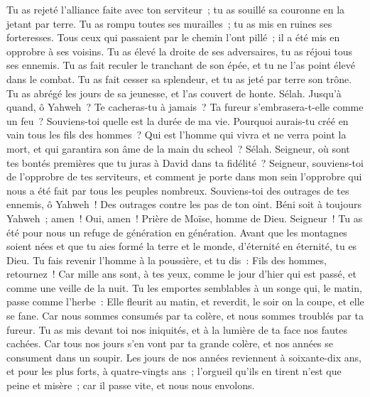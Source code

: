 \begin{multicols}{2}
Tu as rejeté l'alliance faite avec ton serviteur~; tu as souillé sa couronne en la jetant par terre.
Tu as rompu toutes ses murailles~; tu as mis en ruines ses forteresses.
Tous ceux qui passaient par le chemin l'ont pillé~; il a été mis en opprobre à ses voisins.
Tu as élevé la droite de ses adversaires, tu as réjoui tous ses ennemis.
Tu as fait reculer le tranchant de son épée, et tu ne l'as point élevé dans le combat.
Tu as fait cesser sa splendeur, et tu as jeté par terre son trône.
Tu as abrégé les jours de sa jeunesse, et l'as couvert de honte. Sélah.
Jusqu'à quand, ô Yahweh~? Te cacheras-tu à jamais~? Ta fureur s'embrasera-t-elle comme un feu~?
Souviens-toi quelle est la durée de ma vie. Pourquoi aurais-tu créé en vain tous les fils des hommes~?
Qui est l'homme qui vivra et ne verra point la mort, et qui garantira son âme de la main du scheol~? Sélah.
Seigneur, où sont tes bontés premières que tu juras à David dans ta fidélité~?
Seigneur, souviens-toi de l'opprobre de tes serviteurs, et comment je porte dans mon sein l'opprobre qui nous a été fait par tous les peuples nombreux.
Souviens-toi des outrages de tes ennemis, ô Yahweh~! Des outrages contre les pas de ton oint.
Béni soit à toujours Yahweh~; amen~! Oui, amen~!
\VerseOne{}Prière de Moïse, homme de Dieu. Seigneur~! Tu as été pour nous un refuge de génération en génération.
Avant que les montagnes soient nées et que tu aies formé la terre et le monde, d'éternité en éternité, tu es Dieu.
Tu fais revenir l'homme à la poussière, et tu dis~: Fils des hommes, retournez~!
Car mille ans sont, à tes yeux, comme le jour d'hier qui est passé, et comme une veille de la nuit.
Tu les emportes semblables à un songe qui, le matin, passe comme l'herbe~:
Elle fleurit au matin, et reverdit, le soir on la coupe, et elle se fane.
Car nous sommes consumés par ta colère, et nous sommes troublés par ta fureur.
Tu as mis devant toi nos iniquités, et à la lumière de ta face nos fautes cachées.
Car tous nos jours s'en vont par ta grande colère, et nos années se consument dans un soupir.
Les jours de nos années reviennent à soixante-dix ans, et pour les plus forts, à quatre-vingts ans~; l'orgueil qu'ils en tirent n'est que peine et misère~; car il passe vite, et nous nous envolons.

\end{multicols}
